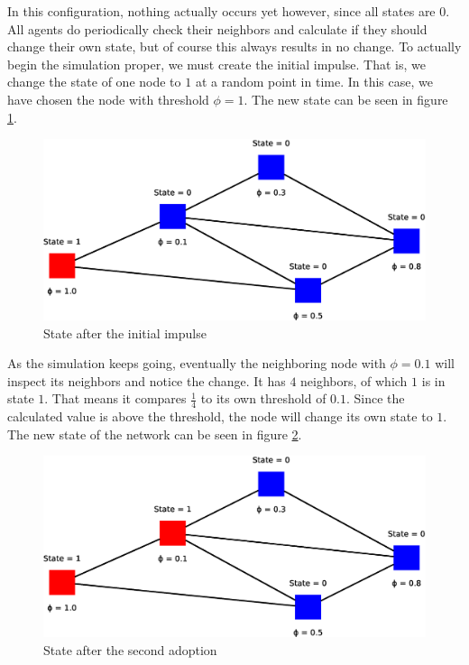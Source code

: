 \documentclass{sig-alternate-05-2015}
\begin{document}
In this configuration, nothing actually occurs yet however, since all states are $0$. All agents do periodically check their neighbors and calculate if they should change their own state, but of course this always results in no change. To actually begin the simulation proper, we must create the initial impulse. That is, we change the state of one node to $1$ at a random point in time. In this case, we have chosen the node with threshold $\phi = 1$. The new state can be seen in figure \ref{fig:model2}.

\begin{figure}[h!]
    \includegraphics[width=\columnwidth]{../presentation/img/model5}
    \centering
    \caption{State after the initial impulse}
    \label{fig:model2}
\end{figure}

As the simulation keeps going, eventually the neighboring node with $\phi = 0.1$ will inspect its neighbors and notice the change. It has $4$ neighbors, of which $1$ is in state $1$. That means it compares $\frac{1}{4}$ to its own threshold of $0.1$. Since the calculated value is above the threshold, the node will change its own state to $1$. The new state of the network can be seen in figure \ref{fig:model3}.

\begin{figure}[h!]
    \includegraphics[width=\columnwidth]{../presentation/img/model6}
    \centering
    \caption{State after the second adoption}
    \label{fig:model3}
\end{figure}
\end{document}
